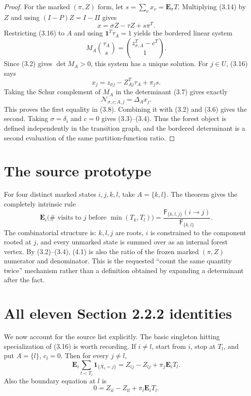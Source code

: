 \documentclass[11pt]{article}
\newcommand{\E}{\mathbf E}
\newcommand{\one}{\mathbf 1}
\newcommand{\cF}{\mathsf F}
\begin{document}
\begin{proof}
For the marked $(\pi,Z)$ form, let $s=\sum_v x_v=\E_\sigma T$.  Multiplying (3.14) by $Z$ and using $(I-P)Z=I-\Pi$ gives
\begin{equation}
x=\sigma Z-\tau Z+s\pi^T.
\tag{3.16}
\end{equation}
Restricting (3.16) to $A$ and using $\one^T\tau_A=1$ yields the bordered linear system
\begin{equation}
M_A\binom{\tau_A}{s}
=
\binom{z_{\sigma,A}^T-c^T}{1}.
\tag{3.17}
\end{equation}
Since (3.2) gives $\det M_A>0$, this system has a unique solution.  For $j\in U$, (3.16) says
\[
x_j=z_{\sigma j}-Z_{Aj}^T\tau_A+\pi_js.
\]
Taking the Schur complement of $M_A$ in the determinant (3.7) gives exactly
\[
\mathcal N_{\sigma,c;A,j}=\Delta_A x_j.
\]
This proves the first equality in (3.8).  Combining it with (3.2) and (3.6) gives the second.  Taking $\sigma=\delta_i$ and $c=0$ gives (3.3)--(3.4).  Thus the forest object is defined independently in the transition graph, and the bordered determinant is a second evaluation of the same partition-function ratio.
\end{proof}

\section{The source prototype}
For four distinct marked states $i,j,k,l$, take $A=\{k,l\}$.  The theorem gives the completely intrinsic rule
\begin{equation}
\boxed{
\E_i\bigl(\#\text{ visits to }j\text{ before }\min(T_k,T_l)\bigr)
=
\frac{\cF_{\{k,l,j\}}(i\to j)}{\cF_{\{k,l\}}}.
}
\tag{4.1}
\end{equation}
The combinatorial structure is: $k,l,j$ are roots, $i$ is constrained to the component rooted at $j$, and every unmarked state is summed over as an internal forest vertex.  By (3.2)--(3.4), (4.1) is also the ratio of the frozen marked $(\pi,Z)$ numerator and denominator.  This is the requested ``count the same quantity twice'' mechanism rather than a definition obtained by expanding a determinant after the fact.

\section{All eleven Section 2.2.2 identities}
We now account for the source list explicitly.  The basic singleton hitting specialization of (3.16) is worth recording.  If $i\ne l$, start from $i$, stop at $T_l$, and put $A=\{l\}$, $c_l=0$.  Then for every $j\ne l$,
\begin{equation}
\E_i\sum_{t<T_l}\mathbf1_{\{X_t=j\}}
=Z_{ij}-Z_{lj}+\pi_j\E_iT_l.
\tag{5.1}
\end{equation}
Also the boundary equation at $l$ is
\begin{equation}
0=Z_{il}-Z_{ll}+\pi_l\E_iT_l.
\tag{5.2}
\end{equation}
\end{document}
